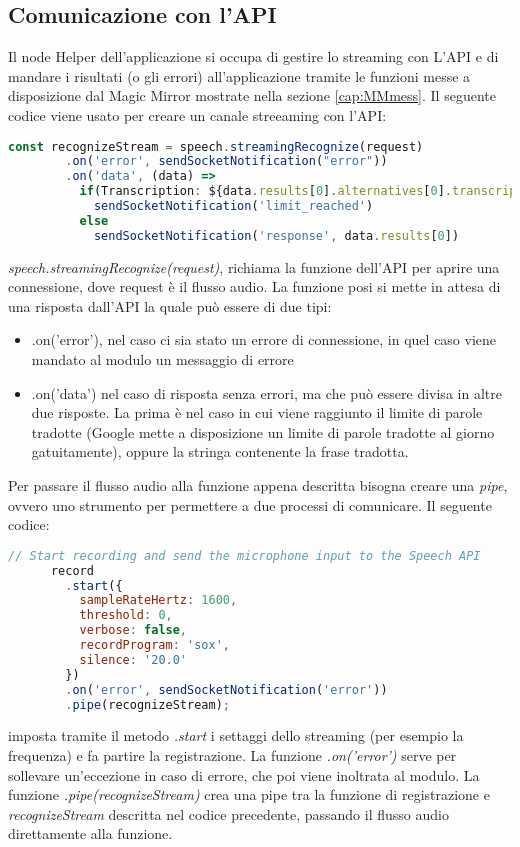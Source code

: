 \subsection{Comunicazione con l'API}
Il node Helper dell'applicazione si occupa di gestire lo streaming con L'API e
di mandare i risultati (o gli errori) all'applicazione tramite le funzioni messe
a disposizione dal Magic Mirror mostrate nella sezione \ref{cap:MMmess}.
Il seguente codice viene usato per creare un canale streeaming con l'API:
\begin{lstlisting}[language=Javascript, caption={Codice per la comunicazione con l'API}, captionpos=b]
      const recognizeStream = speech.streamingRecognize(request)
        .on('error', sendSocketNotification("error"))
        .on('data', (data) =>
          if(Transcription: ${data.results[0].alternatives[0].transcript}\n)
            sendSocketNotification('limit_reached')
          else
            sendSocketNotification('response', data.results[0])
\end{lstlisting}
\emph{speech.streamingRecognize(request)}, richiama la funzione dell'API per aprire una connessione, dove request è
il flusso audio.
La funzione posi si mette in attesa di una risposta dall'API la quale può essere di due tipi:
\begin{itemize}
\item .on('error'), nel caso ci sia stato un errore di connessione, in quel caso viene mandato al modulo un messaggio di errore
\item .on('data') nel caso di risposta senza errori, ma che può essere divisa in altre due risposte. La prima è nel caso in cui
viene raggiunto il limite di parole tradotte (Google mette a disposizione un limite di parole tradotte al giorno gatuitamente), oppure
la stringa contenente la frase tradotta.\\[1\baselineskip]
\end{itemize}
Per passare il flusso audio alla funzione appena descritta bisogna creare una \emph{pipe}, ovvero uno strumento
per permettere a due processi di comunicare.
Il seguente codice:
\begin{lstlisting}[language=Javascript]
      // Start recording and send the microphone input to the Speech API
      record
        .start({
          sampleRateHertz: 1600,
          threshold: 0,
          verbose: false,
          recordProgram: 'sox',
          silence: '20.0'
        })
        .on('error', sendSocketNotification('error'))
        .pipe(recognizeStream);
\end{lstlisting}
imposta tramite il metodo \emph{.start} i settaggi dello streaming (per esempio la frequenza) e fa partire la registrazione.
La funzione \emph{.on('error')} serve per sollevare un'eccezione in caso di errore, che poi viene inoltrata al modulo.
La funzione \emph{.pipe(recognizeStream)} crea una pipe tra la funzione di registrazione e \emph{recognizeStream} descritta nel codice precedente,
passando il flusso audio direttamente alla funzione.

